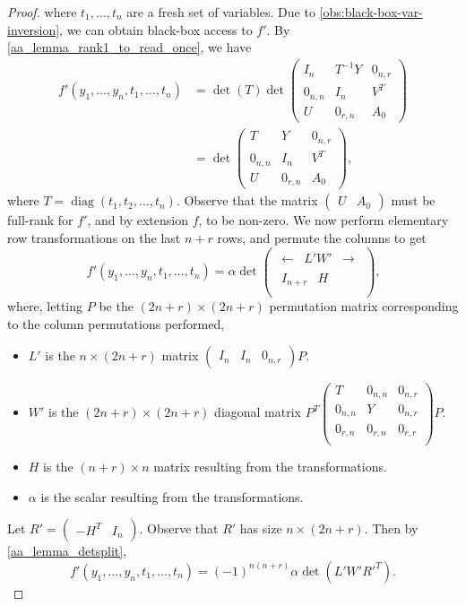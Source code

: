 \documentclass[11pt,letterpaper]{article}
\DeclareMathOperator*{\diag}{diag}
\begin{document}
{{{\begin{proof}
where $t_1,\dots,t_n$ are a fresh set of variables. Due to \cref{obs:black-box-var-inversion}, we can obtain black-box access to $f'$. By \cref{aa_lemma_rank1_to_read_once}, we have
\begin{align*}
    f'(y_1, \dots, y_n, t_1, \dots, t_n) &= \det(T)\det\begin{pmatrix}
        I_n & T^{-1}Y & 0_{n,r} \\
        0_{n,n} & I_{n} & V^T \\
        U & 0_{r,n} & A_0
    \end{pmatrix} \\
    &= \det\begin{pmatrix}
        T & Y & 0_{n,r} \\
        0_{n,n} & I_{n} & V^T \\
        U & 0_{r,n} & A_0
    \end{pmatrix}\text{,}
\end{align*}
where $T = \diag(t_1, t_2, \dots, t_n)$. Observe that the matrix $\begin{pmatrix}U & A_0\end{pmatrix}$ must be full-rank for $f'$, and by extension $f$, to be non-zero. We now perform elementary row transformations on the last $n+r$ rows, and permute the columns to get
\[f'(y_1, \dots, y_n, t_1, \dots, t_n) = \alpha\det\begin{pmatrix}
        \begin{array}{ccc} \leftarrow & L'W' & \rightarrow \end{array} \\
        \begin{array}{cc} I_{n+r} & H \end{array} \\
    \end{pmatrix}\text{,}\]
where, letting $P$ be the $(2n+r) \times (2n+r)$ permutation matrix corresponding to the column permutations performed,
\begin{itemize}
    \item $L'$ is the $n \times (2n+r)$ matrix $\begin{pmatrix}I_n & I_n & 0_{n,r}\end{pmatrix} P$.
    \item $W'$ is the $(2n+r) \times (2n+r)$ diagonal matrix $P^T\begin{pmatrix}
        T & 0_{n,n} & 0_{n,r} \\
        0_{n,n} & Y & 0_{n,r} \\
        0_{r,n} & 0_{r,n} & 0_{r,r} \\
    \end{pmatrix}P$.
    \item $H$ is the $(n+r) \times n$ matrix resulting from the transformations.
    \item $\alpha$ is the scalar resulting from the transformations.
\end{itemize}
Let $R' = \begin{pmatrix}-H^T & I_n\end{pmatrix}$. Observe that $R'$ has size $n \times (2n+r)$. Then by \cref{aa_lemma_detsplit},
\[f'(y_1, \dots, y_n, t_1, \dots, t_n) = (-1)^{n(n+r)}\alpha\det(L'W'R'^T)\text{.}\]


\end{proof}}}}
\end{document}
